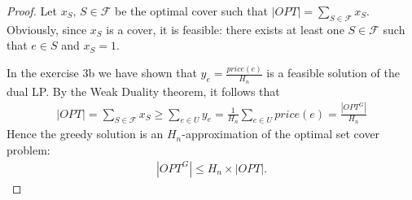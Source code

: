 \documentclass[10pt]{article}
\newcommand{\Fcal}{\mathcal{F}}
\newenvironment{exercise}[2][Exercise]{\begin{trivlist}
  \item[\hskip \labelsep {\bfseries #1}\hskip \labelsep {\bfseries #2.}]}{\end{trivlist}}
\begin{document}
\begin{exercise}{3c}

  \begin{proof}
  Let $x_S,\, S \in \Fcal$ be the optimal cover such that $|OPT| = \sum_{S\in
    \Fcal} x_S$. Obviously, since $x_S$ is a cover, it is feasible: 
  there exists at least one $S \in \Fcal$ such that $e \in S$ and $x_S = 1$.

  In the exercise 3b we have shown that $y_e = \frac{price(e)}{H_n}$ is a
  feasible solution of the dual LP. By the Weak Duality theorem, it follows that
  \begin{align*}
    |OPT| = \sum_{S \in \Fcal} x_S \geq \sum_{e \in U} y_e = \frac{1}{H_n}\sum_{e \in U} price(e) = \frac{|OPT^{G}|}{H_n}
  \end{align*}
  Hence the greedy solution is an $H_n$-approximation of the optimal set cover problem:
  \begin{align*}
    |OPT^G| \leq H_n\times |OPT|.
  \end{align*}
  \end{proof}
\end{exercise}
\end{document}
